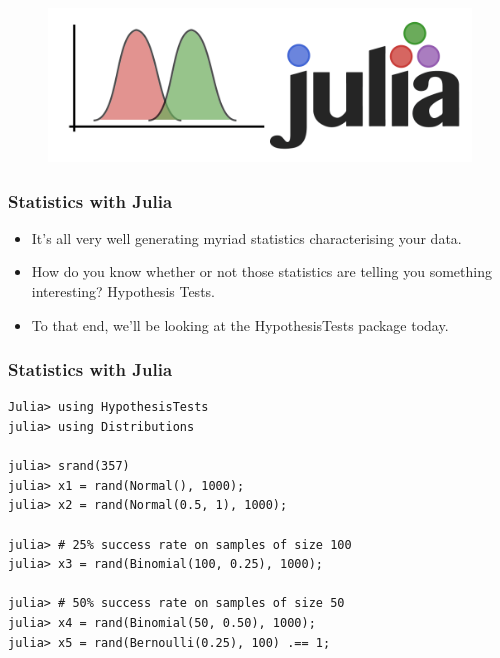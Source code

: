 \documentclass[Master.tex]{subfiles}
\begin{document}
\begin{frame}
\begin{figure}
\centering
\includegraphics[width=1.05\linewidth]{images/Julia-Logo-HypothesisTests}

\end{figure}

\end{frame}	
\begin{frame}[fragile]
	\frametitle{Statistics with Julia}
	\large
	\begin{itemize}
		\item It’s all very well generating myriad statistics characterising your data. 
		\item How do you know whether or not those statistics are telling you something interesting? Hypothesis Tests. 
		\item To that end, we’ll be looking at the HypothesisTests package today.
	\end{itemize}

\end{frame}
\begin{frame}[fragile]
	\frametitle{Statistics with Julia}
	\large
	\begin{verbatim}
Julia> using HypothesisTests
julia> using Distributions

julia> srand(357)
julia> x1 = rand(Normal(), 1000);
julia> x2 = rand(Normal(0.5, 1), 1000);

julia> # 25% success rate on samples of size 100
julia> x3 = rand(Binomial(100, 0.25), 1000); 

julia> # 50% success rate on samples of size 50  
julia> x4 = rand(Binomial(50, 0.50), 1000);   
julia> x5 = rand(Bernoulli(0.25), 100) .== 1;
\end{verbatim}
\end{frame}
\end{document}
